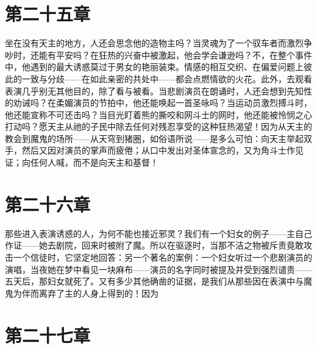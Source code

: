 
\section{第二十五章}

坐在没有天主的地方，人还会思念他的造物主吗？当灵魂为了一个驭车者而激烈争吵时，还能有平安吗？在狂热的兴奋中被激起，他会学会谦逊吗？不，在整个事件中，他遇到的最大诱惑莫过于男女的艳丽装束。情感的相互交织、在偏爱问题上彼此的一致与分歧——在如此亲密的共处中——都会点燃情欲的火花。此外，去观看表演几乎别无其他目的，除了看与被看。当悲剧演员在朗诵时，人还会想到先知性的劝诫吗？在柔媚演员的节拍中，他还能唤起一首圣咏吗？当运动员激烈搏斗时，他还能宣称不可还击吗？当目光盯着熊的撕咬和网斗士的网时，他还能被怜悯之心打动吗？愿天主从祂的子民中除去任何对残忍享受的这种狂热渴望！因为从天主的教会到魔鬼的场所——从天穹到猪圈，如俗语所说——是多么可怕：向天主举起双手，然后又因对演员的掌声而疲倦；从口中发出对圣体宣念的，又为角斗士作见证；向任何人喊，而不是向天主和基督！\par


\section{第二十六章}

那些进入表演诱惑的人，为何不能也接近邪灵？我们有一个妇女的例子——主自己作证——她去剧院，回来时被附了魔。所以在驱逐时，当那不洁之物被斥责竟敢攻击一个信徒时，它坚定地回答：另一个著名的案例：一个妇女听过一个悲剧演员的演唱，当夜她在梦中看见一块麻布——演员的名字同时被提及并受到强烈谴责——五天后，那妇女就死了。又有多少其他确凿的证据，是我们从那些因在表演中与魔鬼为伴而离弃了主的人身上得到的！因为 \par


\section{第二十七章}


